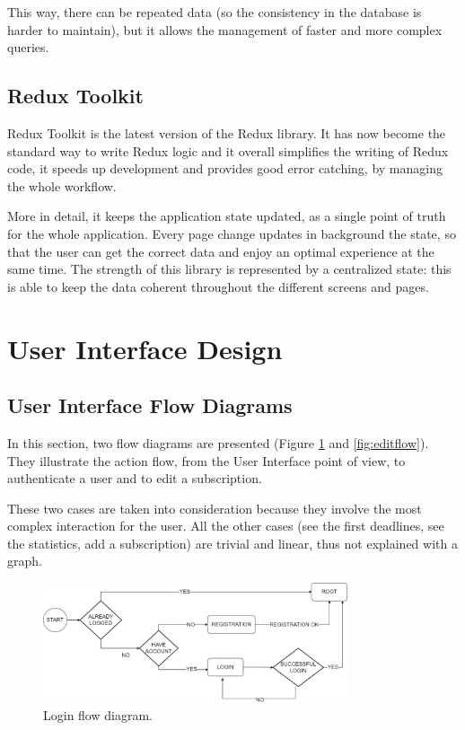 \documentclass[11pt]{article}
\begin{document}
This way, there can be repeated data (so the consistency in the database is harder to maintain), but it allows the management of faster and more complex queries.


\subsection{Redux Toolkit}
Redux Toolkit is the latest version of the Redux library. It has now become the standard way to write Redux logic and it overall simplifies the writing of Redux code, it speeds up development and provides good error catching, by managing the whole workflow.

More in detail, it keeps the application state updated, as a single point of truth for the whole application. Every page change updates in background the state, so that the user can get the correct data and enjoy an optimal experience at the same time. The strength of this library is represented by a centralized state: this is able to keep the data coherent throughout the different screens and pages.


\newpage
\section{User Interface Design}\label{sec:ui}

\subsection{User Interface Flow Diagrams}
In this section, two flow diagrams are presented (Figure \ref{fig:loginflow} and \ref{fig:editflow}). They illustrate the action flow, from the User Interface point of view, to authenticate a user and to edit a subscription.

These two cases are taken into consideration because they involve the most complex interaction for the user. All the other cases (see the first deadlines, see the statistics, add a subscription) are trivial and linear, thus not explained with a graph.

\begin{figure}[h!]
    \begin{center}
        \includegraphics[width=0.8\textwidth, clip]{../../assets/loginFlow.png}
    \end{center}
    \caption{Login flow diagram.}
    \label{fig:loginflow}
\end{figure}
\end{document}
